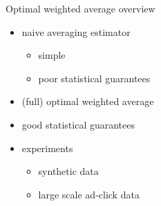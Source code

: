 \begin{frame}{Optimal weighted average overview}

\begin{itemize}
\Large
\item naive averaging estimator
\begin{itemize}
\Large
\item simple
\item poor statistical guarantees
\end{itemize}
\item (full) optimal weighted average
\item good statistical guarantees
\item experiments
\begin{itemize}
\Large
\item synthetic data
\item large scale ad-click data
\end{itemize}
\end{itemize}

\end{frame}


